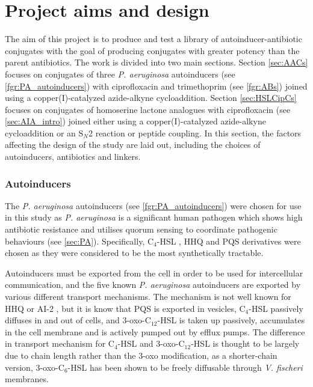 \newpage

\section{Project aims and design}

The aim of this project is to produce and test a library of autoinducer-antibiotic conjugates with the goal of producing conjugates with greater potency than the parent antibiotics.
The work is divided into two main sections. 
Section \ref{sec:AACs} focuses on conjugates of three \textit{P. aeruginosa} autoinducers (see \ref{fgr:PA_autoinducers}) with ciprofloxacin and trimethoprim (see \ref{fgr:ABs}) joined using a copper(I)-catalyzed azide-alkyne cycloaddition.
Section \ref{sec:HSLCipCs} focuses on conjugates of homoserine lactone analogues with ciprofloxacin (see \ref{sec:AIA_intro}) joined either using a copper(I)-catalyzed azide-alkyne cycloaddition or an S$_N$2 reaction or peptide coupling.
In this section, the factors affecting the design of the study are laid out, including the choices of autoinducers, antibiotics and linkers.

\subsubsection{Autoinducers}

The \textit{P. aeruginosa} autoinducers (see \ref{fgr:PA_autoinducers}) were chosen for use in this study as \textit{P. aeruginosa} is a significant human pathogen which shows high antibiotic resistance and utilises quorum sensing to coordinate pathogenic behaviours (see \ref{sec:PA}). 
Specifically, C$_4$-HSL , HHQ  and PQS  derivatives were chosen as they were considered to be the most synthetically tractable.

Autoinducers must be exported from the cell in order to be used for intercellular communication, and the five known \textit{P. aeruginosa} autoinducers are exported by various different transport mechanisms.
The mechanism is not well known for HHQ  or AI-2 , but it is know that
PQS  is exported in vesicles\cite{Florez2017},
C$_4$-HSL  passively diffuses in and out of cells\cite{Pearson1999}, and
3-oxo-C$_{12}$-HSL  is taken up passively, accumulates in the cell membrane and is actively pumped out by efflux pumps.
The difference in transport mechanism for C$_4$-HSL  and 3-oxo-C$_{12}$-HSL  is thought to be largely due to chain length rather than the 3-oxo modification, as a shorter-chain version, 3-oxo-C$_6$-HSL  has been shown to be freely diffusable through \textit{V. fischeri} membranes\cite{Kaplan1985}.

